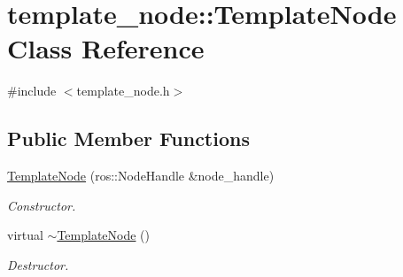 \hypertarget{classtemplate__node_1_1TemplateNode}{}\section{template\+\_\+node\+:\+:Template\+Node Class Reference}
\label{classtemplate__node_1_1TemplateNode}


{\ttfamily \#include $<$template\+\_\+node.\+h$>$}

\subsection*{Public Member Functions}
\begin{DoxyCompactItemize}
\item 
\hyperlink{classtemplate__node_1_1TemplateNode_a4747c3118482eb109592c8877a5c1139}{Template\+Node} (ros\+::\+Node\+Handle \&node\+\_\+handle)
\begin{DoxyCompactList}\small\item\em Constructor. \end{DoxyCompactList}\item 
virtual \hyperlink{classtemplate__node_1_1TemplateNode_ae074b649a55e47a0a0e4ef26cd6b60c8}{$\sim$\+Template\+Node} ()
\begin{DoxyCompactList}\small\item\em Destructor. \end{DoxyCompactList}\end{DoxyCompactItemize}
